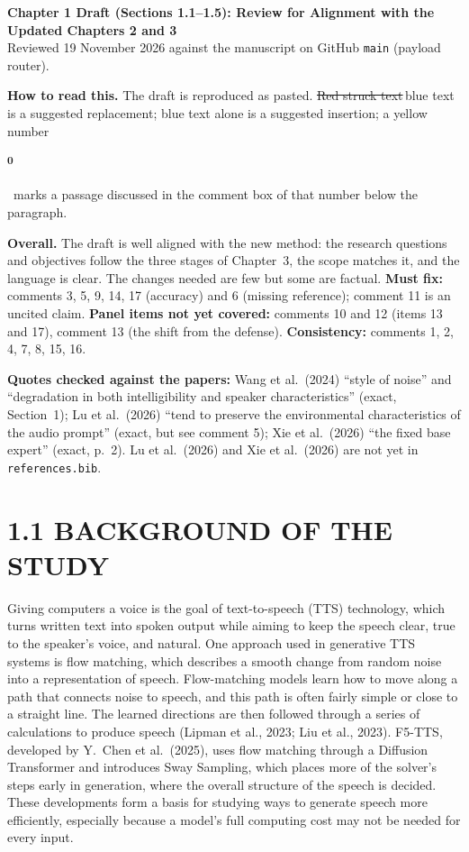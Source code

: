 \documentclass[11pt,a4paper]{article}
\newcommand{\chg}[2]{{\color{delcol}\sout{#1}}\,{\color{addcol}#2}}
\newcommand{\add}[1]{{\color{addcol}#1}}
\newcommand{\flag}[2]{\colorbox{flagcol}{\strut\textsuperscript{\bfseries #1}}\,{#2}}
\begin{document}
{\large\bfseries Chapter 1 Draft (Sections 1.1--1.5): Review for Alignment with the Updated Chapters 2 and 3}\\[3pt]
{\small Reviewed 19 November 2026 against the manuscript on GitHub \texttt{main} (payload router).}

\begin{tcolorbox}[colback=white, colframe=black!40, boxrule=0.4pt, arc=1.5pt, fontupper=\small]
\textbf{How to read this.} The draft is reproduced as pasted. \chg{Red struck text}{blue text} is a suggested replacement; \add{blue text alone} is a suggested insertion; a yellow number \flag{0}{} marks a passage discussed in the comment box of that number below the paragraph.

\smallskip
\textbf{Overall.} The draft is well aligned with the new method: the research questions and objectives follow the three stages of Chapter~3, the scope matches it, and the language is clear. The changes needed are few but some are factual. \textbf{Must fix:} comments 3, 5, 9, 14, 17 (accuracy) and 6 (missing reference); comment 11 is an uncited claim. \textbf{Panel items not yet covered:} comments 10 and 12 (items 13 and 17), comment 13 (the shift from the defense). \textbf{Consistency:} comments 1, 2, 4, 7, 8, 15, 16.

\smallskip
\textbf{Quotes checked against the papers:} Wang et al.\ (2024) ``style of noise'' and ``degradation in both intelligibility and speaker characteristics'' (exact, Section~1); Lu et al.\ (2026) ``tend to preserve the environmental characteristics of the audio prompt'' (exact, but see comment 5); Xie et al.\ (2026) ``the fixed base expert'' (exact, p.~2). Lu et al.\ (2026) and Xie et al.\ (2026) are not yet in \texttt{references.bib}.
\end{tcolorbox}

\section*{1.1 BACKGROUND OF THE STUDY}

Giving computers a voice is the goal of text-to-speech (TTS) technology, which turns written text into spoken output while aiming to keep the speech clear, true to the speaker's voice, and natural. One approach used in generative TTS systems is flow matching, which describes a smooth change from random noise into a representation of speech. Flow-matching models learn how to move along a path that connects noise to speech, and this path is often fairly simple or close to a straight line. The learned directions are then followed through a series of calculations to produce speech (Lipman et al., 2023; Liu et al., 2023). F5-TTS, developed by Y.\ Chen et al.\ (2025), uses flow matching through a Diffusion Transformer and introduces Sway Sampling, which places more of the solver's steps early in generation, where the overall structure of the speech is decided. These developments form a basis for studying ways to generate speech more efficiently, especially because a model's full computing cost may not be needed for every input.
\end{document}

